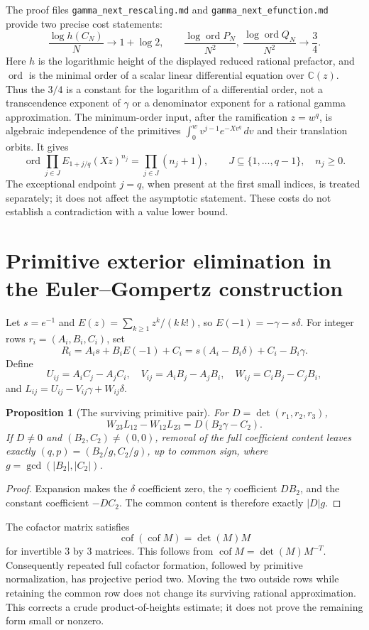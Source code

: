 \documentclass[11pt,a4paper]{article}
\newcommand{\C}{\mathbb C}
\newtheorem{proposition}[theorem]{Proposition}
\theoremstyle{definition}
\theoremstyle{remark}
\numberwithin{equation}{section}
\begin{document}
The proof files \texttt{gamma\_next\_rescaling.md} and
\texttt{gamma\_next\_efunction.md} provide two precise cost statements:
\[
 \frac{\log h(C_N)}N\longrightarrow1+\log2,
 \qquad
 \frac{\log\operatorname{ord}P_N}{N^2},\
 \frac{\log\operatorname{ord}Q_N}{N^2}\longrightarrow\frac34.
\]
Here $h$ is the logarithmic height of the displayed reduced rational
prefactor, and $\operatorname{ord}$ is the minimal order of a scalar
linear differential equation over $\C(z)$.  Thus the $3/4$ is a constant
for the logarithm of a differential order, not a transcendence exponent
of $\gamma$ or a denominator exponent for a rational gamma approximation.
The minimum-order input, after the ramification $z=w^q$, is algebraic
independence of the primitives
$\int_0^w v^{j-1}e^{-Xv^q}\,dv$ and their translation orbits.  It gives
\[
 \operatorname{ord}\prod_{j\in J}E_{1+j/q}(Xz)^{n_j}
 =\prod_{j\in J}(n_j+1),\qquad
 J\subseteq\{1,\ldots,q-1\},\quad n_j\ge0.
\]
The exceptional endpoint $j=q$, when present at the first small indices,
is treated separately; it does not affect the asymptotic statement.
These costs do not establish a contradiction with a value lower bound.

\section{Primitive exterior elimination in the Euler--Gompertz construction}
\label{ec:exterior}

Let $s=e^{-1}$ and $E(z)=\sum_{k\ge1}z^k/(k\,k!)$, so
$E(-1)=-\gamma-s\delta$.  For integer rows $r_i=(A_i,B_i,C_i)$, set
\[
 R_i=A_is+B_iE(-1)+C_i
     =s(A_i-B_i\delta)+C_i-B_i\gamma.
\]
Define
\[
 U_{ij}=A_iC_j-A_jC_i,\quad
 V_{ij}=A_iB_j-A_jB_i,\quad
 W_{ij}=C_iB_j-C_jB_i,
\]
and $L_{ij}=U_{ij}-V_{ij}\gamma+W_{ij}\delta$.

\begin{proposition}[The surviving primitive pair]
\label{ec:shared-row}
For $D=\det(r_1,r_2,r_3)$,
\[
 W_{23}L_{12}-W_{12}L_{23}=D(B_2\gamma-C_2).
\]
If $D\ne0$ and $(B_2,C_2)\ne(0,0)$, removal of the full coefficient
content leaves exactly $(q,p)=(B_2/g,C_2/g)$, up to common sign, where
$g=\gcd(|B_2|,|C_2|)$.
\end{proposition}
\begin{proof}
Expansion makes the $\delta$ coefficient zero, the $\gamma$ coefficient
$DB_2$, and the constant coefficient $-DC_2$.  The common content is
therefore exactly $|D|g$.
\end{proof}
The cofactor matrix satisfies
\[
 \operatorname{cof}(\operatorname{cof}M)=\det(M)M
\]
for invertible $3$ by $3$ matrices.  This follows from
$\operatorname{cof}M=\det(M)M^{-T}$.  Consequently repeated full
cofactor formation, followed by primitive normalization, has projective
period two.  Moving the two outside rows while retaining the common row
does not change its surviving rational approximation.  This corrects a
crude product-of-heights estimate; it does not prove the remaining form
small or nonzero.
\end{document}
